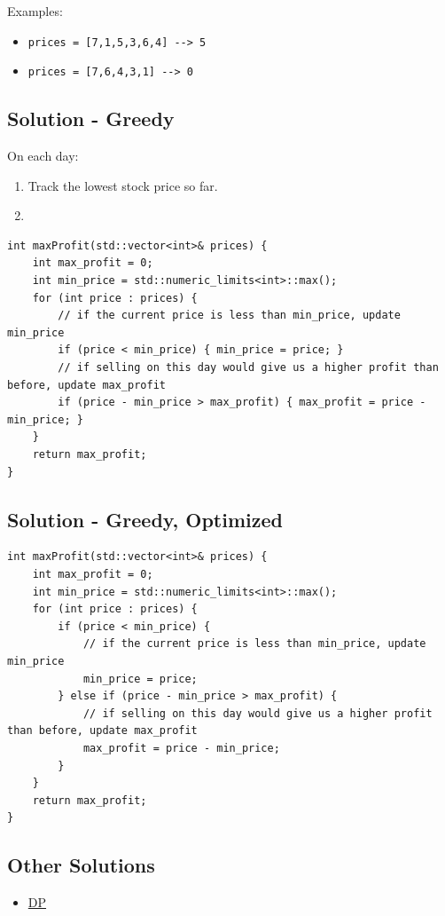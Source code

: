 Examples:
\begin{itemize}
	\item {\colorbox{CodeBackground}{\lstinline|prices = [7,1,5,3,6,4] --> 5|}}
	\item {\colorbox{CodeBackground}{\lstinline|prices = [7,6,4,3,1] --> 0|}}
\end{itemize}

\subsection*{Solution - Greedy}\label{solution:lc0121_greedy}
On each day:
\begin{enumerate}
\item Track the lowest stock price so far.
\item {\color{magenta}{Try to sell the stock to see whether we can achieve a higher profit.}}
\end{enumerate}
\begin{lstlisting}
int maxProfit(std::vector<int>& prices) {
	int max_profit = 0;
	int min_price = std::numeric_limits<int>::max();
	for (int price : prices) {
		// if the current price is less than min_price, update min_price
		if (price < min_price) { min_price = price; }
		// if selling on this day would give us a higher profit than before, update max_profit
		if (price - min_price > max_profit) { max_profit = price - min_price; }
	}
	return max_profit;
}
\end{lstlisting}

\subsection*{Solution - Greedy, Optimized}
\begin{lstlisting}
int maxProfit(std::vector<int>& prices) {
	int max_profit = 0;
	int min_price = std::numeric_limits<int>::max();
	for (int price : prices) {
		if (price < min_price) {
			// if the current price is less than min_price, update min_price
			min_price = price;
		} else if (price - min_price > max_profit) {
			// if selling on this day would give us a higher profit than before, update max_profit
			max_profit = price - min_price;
		}
	}
	return max_profit;
}
\end{lstlisting}

\subsection*{Other Solutions}
\begin{itemize}
\item \hyperref[solution:lc0121_dp]{DP}
\end{itemize}

